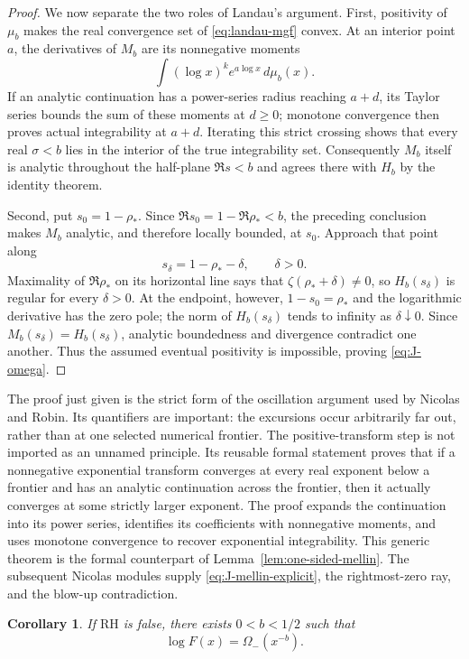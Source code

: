 \documentclass[11pt]{amsart}
\newtheorem{corollary}[theorem]{Corollary}
\theoremstyle{definition}
\theoremstyle{remark}
\numberwithin{equation}{section}
\newcommand{\RH}{\mathrm{RH}}
\begin{document}
\begin{proof}
We now separate the two roles of Landau's argument.  First, positivity of
$\mu_b$ makes the real convergence set of \eqref{eq:landau-mgf} convex.
At an interior point $a$, the derivatives of $M_b$ are its nonnegative
moments
\[
  \int (\log x)^k e^{a\log x}\,d\mu_b(x).
\]
If an analytic continuation has a power-series radius reaching $a+d$, its
Taylor series bounds the sum of these moments at $d\ge0$; monotone
convergence then proves actual integrability at $a+d$.  Iterating this strict
crossing shows that every real $\sigma<b$ lies in the interior of the true
integrability set.  Consequently $M_b$ itself is analytic throughout the
half-plane $\Re s<b$ and agrees there with $H_b$ by the identity theorem.

Second, put $s_0=1-\rho_*$.  Since
$\Re s_0=1-\Re\rho_*<b$, the preceding conclusion makes $M_b$ analytic, and
therefore locally bounded, at $s_0$.  Approach that point along
\[
  s_\delta=1-\rho_*-\delta,\qquad \delta>0.
\]
Maximality of $\Re\rho_*$ on its horizontal line says that
$\zeta(\rho_*+\delta)\ne0$, so $H_b(s_\delta)$ is regular for every
$\delta>0$.  At the endpoint, however, $1-s_0=\rho_*$ and the logarithmic
derivative has the zero pole; the norm of $H_b(s_\delta)$ tends to infinity
as $\delta\downarrow0$.  Since $M_b(s_\delta)=H_b(s_\delta)$, analytic
boundedness and divergence contradict one another.  Thus the assumed
eventual positivity is impossible, proving \eqref{eq:J-omega}.
\end{proof}

The proof just given is the strict form of the oscillation argument used by
Nicolas and Robin.  Its quantifiers are important: the excursions occur
arbitrarily far out, rather than at one selected numerical frontier.
The positive-transform step is not imported as an unnamed principle.
Its reusable formal statement proves that if a nonnegative exponential
transform converges at every real exponent below a frontier and has an
analytic continuation across the frontier, then it actually converges at
some strictly larger exponent.  The proof expands the continuation into its
power series, identifies its coefficients with nonnegative moments, and
uses monotone convergence to recover exponential integrability.  This
generic theorem is the formal counterpart of
Lemma~\ref{lem:one-sided-mellin}.
The subsequent Nicolas modules supply \eqref{eq:J-mellin-explicit}, the
rightmost-zero ray, and the blow-up contradiction.

\begin{corollary}\label{cor:finite-nicolas-omega}
If $\RH$ is false, there exists $0<b<1/2$ such that
\begin{equation}\label{eq:logF-omega}
  \log F(x)=\Omega_-(x^{-b}).
\end{equation}
\end{corollary}
\end{document}

